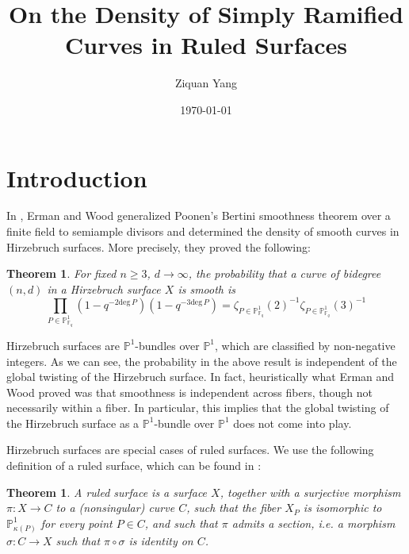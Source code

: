 \documentclass[12pt]{article}
\theoremstyle{plain}
\newtheorem{theorem}[equation]{Theorem}
\theoremstyle{definition}
\newcommand{\IF}{\mathbb{F}}
\newcommand{\IP}{\mathbb{P}}
\renewcommand{\deg}{\mathrm{deg}\,}
\newcommand{\<}{\langle}
\renewcommand{\>}{\rangle}
\begin{document}
%

\title{On the Density of Simply Ramified Curves in Ruled Surfaces}
\author{Ziquan Yang}


\date{\today}

\maketitle
\tableofcontents

 

\setcounter{section}{0}

\section{Introduction}
In \cite{Wood}, Erman and Wood generalized Poonen's Bertini smoothness theorem over a finite field to semiample divisors and determined the density of smooth curves in Hirzebruch surfaces. More precisely, they proved the following: 

\begin{theorem}
For fixed $n \ge 3$, $d \to \infty$, the probability that a curve of bidegree $(n, d)$ in a Hirzebruch surface $X$ is smooth is 
$$ \prod_{P \in \IP^1_{\IF_q}} (1 - q^{ - 2 \deg P})(1 - q^{-3 \deg P}) = \zeta_{P \in \IP^1_{\IF_q}}(2)^{-1} \zeta_{P \in \IP^1_{\IF_q}}(3)^{-1} $$
\end{theorem}
Hirzebruch surfaces are $\IP^1$-bundles over $\IP^1$, which are classified by non-negative integers. As we can see, the probability in the above result is independent of the global twisting of the Hirzebruch surface. In fact, heuristically what Erman and Wood proved was that smoothness is independent across fibers, though not necessarily within a fiber. In particular, this implies that the global twisting of the Hirzebruch surface as a $\IP^1$-bundle over $\IP^1$ does not come into play.  

Hirzebruch surfaces are special cases of ruled surfaces. We use the following definition of a ruled surface, which can be found in \cite{Hart}:

\begin{theorem}
\label{main}
A ruled surface is a surface $X$, together with a surjective morphism $\pi : X \to C$ to a (nonsingular) curve $C$, such that the fiber $X_P$ is isomorphic to $\IP^1_{\kappa(P)}$ for every point $P \in C$, and such that $\pi$ admits a section, i.e. a morphism $\sigma : C \to X$ such that $\pi \circ \sigma$ is identity on $C$. 
\end{theorem}
\end{document}
